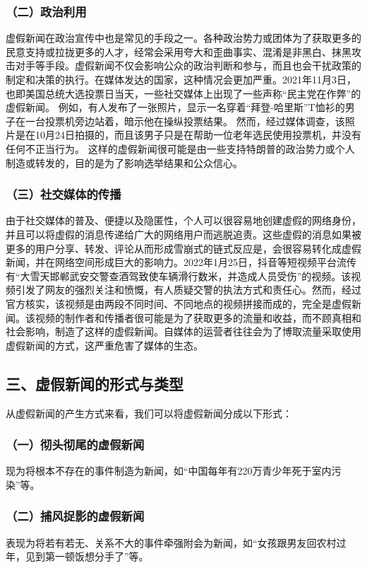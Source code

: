 ﻿\documentclass{ctexart}
\begin{document}
\subsubsection*{\quad \quad （二）政治利用}
虚假新闻在政治宣传中也是常见的手段之一。各种政治势力或团体为了获取更多的民意支持或拉拢更多的人才，经常会采用夸大和歪曲事实、混淆是非黑白、抹黑攻击对手等手段。虚假新闻不仅会影响公众的政治判断和参与，而且也会干扰政策的制定和决策的执行。在媒体发达的国家，这种情况会更加严重。2021年11月3日，也即美国总统大选投票日当天，一些社交媒体上出现了一些声称“民主党在作弊”的虚假新闻。 例如，有人发布了一张照片，显示一名穿着“拜登-哈里斯”T恤衫的男子在一台投票机旁边站着，暗示他在操纵投票结果。 然而，经过媒体调查，该照片是在10月24日拍摄的，而且该男子只是在帮助一位老年选民使用投票机，并没有任何不正当行为。 这样的虚假新闻很可能是由一些支持特朗普的政治势力或个人制造或转发的，目的是为了影响选举结果和公众信心。
\subsubsection*{\quad \quad （三）社交媒体的传播}
由于社交媒体的普及、便捷以及隐匿性，个人可以很容易地创建虚假的网络身份，并且可以将虚假的消息传递给广大的网络用户而逃脱追责。这些虚假的消息如果被更多的用户分享、转发、评论从而形成雪崩式的链式反应是，会很容易转化成虚假新闻，并在网络空间形成巨大的影响力。2022年1月25日，抖音等短视频平台流传有“大雪天邯郸武安交警查酒驾致使车辆滑行数米，并造成人员受伤”的视频。该视频引发了网友的强烈关注和愤慨，有人质疑交警的执法方式和责任心。然而，经过官方核实，该视频是由两段不同时间、不同地点的视频拼接而成的，完全是虚假新闻。该视频的制作者和传播者很可能是为了获取更多的流量和收益，而不顾真相和社会影响，制造了这样的虚假新闻。自媒体的运营者往往会为了博取流量采取使用虚假新闻的方式，这严重危害了媒体的生态。
\subsection*{\textbf{三、虚假新闻的形式与类型}}
从虚假新闻的产生方式来看，我们可以将虚假新闻分成以下形式：
\subsubsection*{\quad \quad （一）彻头彻尾的虚假新闻}
现为将根本不存在的事件制造为新闻，如“中国每年有220万青少年死于室内污染”等。
\subsubsection*{\quad \quad （二）捕风捉影的虚假新闻}
表现为将若有若无、关系不大的事件牵强附会为新闻，如“女孩跟男友回农村过年，见到第一顿饭想分手了”等。
\end{document}
